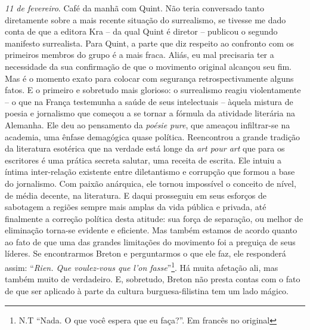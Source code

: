 \emph{11 de fevereiro}. Café da manhã com Quint. Não teria conversado
tanto diretamente sobre a mais recente situação do surrealismo, se
tivesse me dado conta de que a editora Kra -- da qual Quint é diretor --
publicou o segundo manifesto surrealista. Para Quint, a parte que diz
respeito ao confronto com os primeiros membros do grupo é a mais fraca.
Aliás, eu mal precisaria ter a necessidade da sua confirmação de que o
movimento original alcançou seu fim. Mas é o momento exato para colocar
com segurança retrospectivamente alguns fatos. E o primeiro e sobretudo
mais glorioso: o surrealismo reagiu violentamente -- o que na França
testemunha a saúde de seus intelectuais -- àquela mistura de poesia e
jornalismo que começou a se tornar a fórmula da atividade literária na
Alemanha. Ele deu ao pensamento da \emph{poésie pure}, que ameaçou
infiltrar-se na academia, uma ênfase demagógica quase política.
Reencontrou a grande tradição da literatura esotérica que na verdade
está longe da \emph{art pour art} que para os escritores é uma prática
secreta salutar, uma receita de escrita. Ele intuiu a íntima
inter-relação existente entre diletantismo e corrupção que formou a base
do jornalismo. Com paixão anárquica, ele tornou impossível o conceito de
nível, de média decente, na literatura. E daqui prosseguiu em seus
esforços de sabotagem a regiões sempre mais amplas da vida pública e
privada, até finalmente a correção política desta atitude: sua força de
separação, ou melhor de eliminação torna-se evidente e eficiente. Mas
também estamos de acordo quanto ao fato de que uma das grandes
limitações do movimento foi a preguiça de seus líderes. Se encontrarmos
Breton e perguntarmos o que ele faz, ele responderá assim: ``\emph{Rien.
Que voulez-vous que l'on fasse}''\footnote{N.T ``Nada. O que você espera
  que eu faça?''. Em francês no original}. Há muita afetação ali, mas
também muito de verdadeiro. E, sobretudo, Breton não presta contas com o
fato de que ser aplicado à parte da cultura burguesa-filistina tem um
lado mágico.


